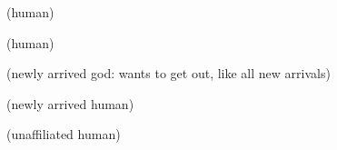 \documentclass[blue]{guardians}
\begin{document}
\name{\bWhosWho{}}


\begin{itemz}[Greek]
  \item\cZeus{}
  \item\cHera{}
  \item\cAthena{}
  \item\cHephaestus{}
  \item\cPandora{} (human)
\end{itemz}

\begin{itemz}[Norse]
  \item\cOdin{}
  \item\cHel{}
  \item\cFenrir{}
  \item%
\end{itemz}

\begin{itemz}[Egyptians]
  \item\cIsis{}
  \item\cAnubis{}
  \item\cOsiris{}
  \item\cEgyptianHuman{} (human)
\end{itemz}

\begin{itemz}[Others]
  \item\cUnity{} (newly arrived god: wants to get out, like all new arrivals)
  \item\cKachiko{} (newly arrived human)
  \item\cJascha{} (unaffiliated human)
  \item\cCaretaker{}
  \item\cWarden{}
\end{itemz}
\end{document}
